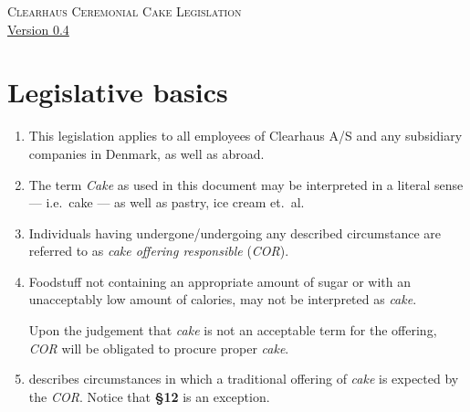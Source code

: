 \documentclass[a4paper, oneside, article]{memoir}
\newcounter{tbc}
\begin{document}
\thispagestyle{empty} %
\begin{center}
  \textsc{\huge Clearhaus Ceremonial Cake Legislation}
  \\
  {\footnotesize \href{https://semver.org/}{Version 0.4}}
\end{center}

\chapter{Legislative basics}

\begin{enumerate}[§ 1]
  \item This legislation applies to all employees of Clearhaus {\small A/S} and
    any subsidiary companies in Denmark, as well as abroad.

  \item The term \emph{Cake} as used in this document may be
    interpreted in a literal sense --- i.e.\ cake --- as well as pastry, ice
    cream et.\ al.
    
  \item Individuals having undergone/undergoing any described circumstance are 
    referred to as \emph{cake offering responsible} (\emph{COR}).

  \item Foodstuff not containing an appropriate amount of sugar or with an
    unacceptably low amount of calories, may not be interpreted as
    \emph{cake}.

    Upon the judgement that \emph{cake} is not an acceptable term for the
    offering, \emph{COR} will be obligated to procure proper \emph{cake}.

  \item {} describes circumstances in which a traditional
    offering of \emph{cake} is expected by the \emph{COR}.   Notice that \textbf{§12} is an exception.

  \setcounter{tbc}{\value{enumi}}
\end{enumerate}
\end{document}
